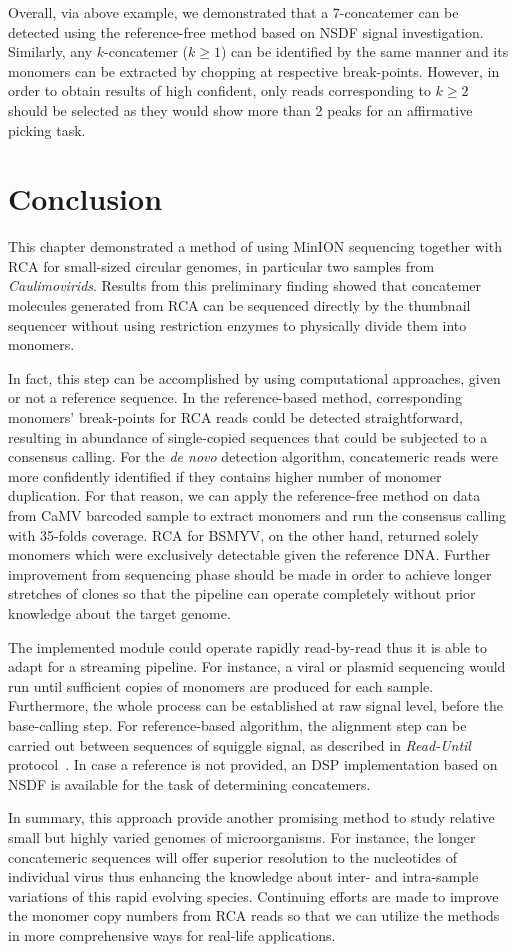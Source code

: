 Overall, via above example, we demonstrated that a 7-concatemer can be detected using the reference-free method based on NSDF signal investigation.
Similarly, any $k$-concatemer ($k \geq 1$) can be identified by the same manner and its monomers can be extracted by chopping at respective break-points. However, in order to obtain results of high confident, only reads corresponding to $k \geq 2$ should be selected as they would show more than 2 peaks for an affirmative picking task.
\section{Conclusion}
This chapter demonstrated a method of using MinION sequencing together with RCA for small-sized circular genomes, in particular two samples from \emph{Caulimovirids}.
Results from this preliminary finding showed that concatemer molecules generated from RCA can be sequenced directly by the thumbnail sequencer without using restriction enzymes to physically divide them into monomers. 

In fact, this step can be accomplished by using computational approaches, given or not a reference sequence.
In the reference-based method, corresponding monomers' break-points for RCA reads could be detected straightforward, resulting in abundance of single-copied sequences that could be subjected to a consensus calling.
For the \emph{de novo} detection algorithm, concatemeric reads were more confidently identified if they contains higher number of monomer duplication. For that reason, we can apply the reference-free method on data from CaMV barcoded sample to extract monomers and run the consensus calling with 35-folds coverage. RCA for BSMYV, on the other hand, returned solely monomers which were exclusively detectable given the reference DNA.
Further improvement from sequencing phase should be made in order to achieve longer stretches of clones so that the pipeline can operate completely without prior knowledge about the target genome.

The implemented module could operate rapidly read-by-read thus it is able to adapt for a streaming pipeline. For instance, a viral or plasmid sequencing would run until sufficient copies of monomers are produced for each sample.
Furthermore, the whole process can be established at raw signal level, before the base-calling step. 
For reference-based algorithm, the alignment step can be carried out between sequences of squiggle signal, as described in \emph{Read-Until} protocol~\cite{LooseMS2016}.
In case a reference is not provided, an DSP implementation based on NSDF is available for the task of determining concatemers.

In summary, this approach provide another promising method to study relative small but highly varied genomes of microorganisms. For instance, the longer concatemeric sequences will offer superior resolution to the nucleotides of individual virus thus enhancing the knowledge about inter- and intra-sample variations of this rapid evolving species. Continuing efforts are made to improve the monomer copy numbers from RCA reads so that we can utilize the methods in more comprehensive ways for real-life applications.
